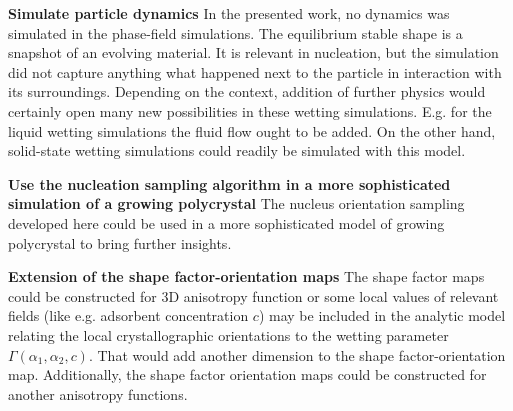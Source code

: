 \textbf{Simulate particle dynamics} In the presented work, no dynamics was simulated in the phase-field simulations. The equilibrium stable shape is a snapshot of an evolving material. It is relevant in nucleation, but the simulation did not capture anything what happened next to the particle in interaction with its surroundings. Depending on the context, addition of further physics would certainly open many new possibilities in these wetting simulations. E.g. for the liquid wetting simulations the fluid flow ought to be added. On the other hand, solid-state wetting simulations could readily be simulated with this model. 
	
\textbf{Use the nucleation sampling algorithm in a more sophisticated simulation of a growing polycrystal} The nucleus orientation sampling developed here could be used in a more sophisticated model of growing polycrystal to bring further insights. 

\textbf{Extension of the shape factor-orientation maps} The shape factor maps could be constructed for 3D anisotropy function or some local values of relevant fields (like e.g. adsorbent concentration $c$) may be included in the analytic model relating the local crystallographic orientations to the wetting parameter $\Gamma(\alpha_1,\alpha_2, c)$. That would add another dimension to the shape factor-orientation map. Additionally, the shape factor orientation maps could be constructed for another anisotropy functions.



\cleardoublepage

